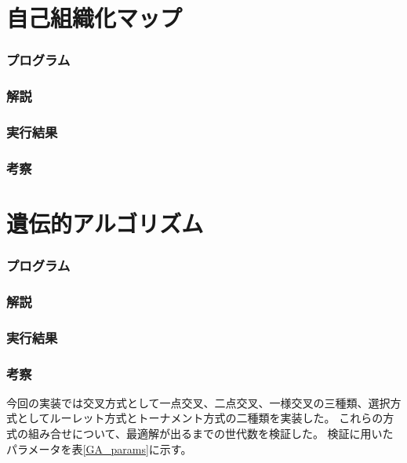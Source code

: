 \documentclass{jsarticle}
\begin{document}
\part{自己組織化マップ}
\section{プログラム}


\section{解説}


\section{実行結果}


\section{考察}


\part{遺伝的アルゴリズム}
\section{プログラム}


\section{解説}


\section{実行結果}


\section{考察}
今回の実装では交叉方式として一点交叉、二点交叉、一様交叉の三種類、選択方式としてルーレット方式とトーナメント方式の二種類を実装した。
これらの方式の組み合せについて、最適解が出るまでの世代数を検証した。
検証に用いたパラメータを表\ref{GA_params}に示す。
\end{document}
